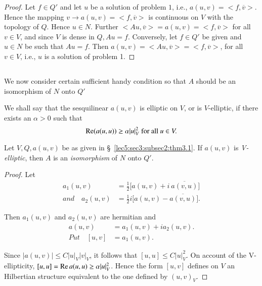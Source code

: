\begin{proof}%
Let $f \in Q'$ and let $u$ be a solution of problem $1$, i.e.,
$a(u, v) = <f, \overline{v}>$. Hence the mapping $v \rightarrow a(u,
v) =   <f, \overline{v}>$ is continuous on $V$ with the topology of
$Q$. Hence $u \in N$. Further $<A u, \overline{v}> = a (u,v) =
<f, \overline{v}>$ for all $v \in V$, and since $V$ is dense
in $Q, Au = f$. Conversely, let $f \in Q'$ be given and $u
\in N$ be such that $Au = f$. Then $a(u, v) = <Au,
\overline{v}> =  <f, \overline{v}>$, for all $v \in V$, i.e.,
$u$ is a solution of problem 1. 
\end{proof}

\subsection{}\label{lec5:sec3:subsec2} 

We now consider certain sufficient handy
condition so that $A$ should be an isomorphism of $N$ onto $Q'$ 
\begin{definition}\label{lec5:sec3:subsec2:def3.2}%
  We shall say that the sesquilinear $a(u, v)$ is elliptic on $V$, or is
  $V$-elliptic, if there exists an $\alpha > 0$ such that 
  $$
  \operatorname{Re}  (a(u, u)) \ge \alpha | u|^2_V \text{ for all } u \in V.
  $$
\end{definition}

\begin{theorem}\label{lec5:sec3:subsec2:thm3.1}%
  Let $V, Q, a(u, v)$ be as given in \S\ \ref{lec5:sec3:subsec2:thm3.1}. If $a(u, v)$ is {\em  
  V-elliptic}, then $A$ is an {\em isomorphism} of $N$ onto $Q'$. 
\end{theorem}

\begin{proof}%
Let\pageoriginale
\begin{align*}a_1(u, v) & = \frac{1}{2}\big[  a(u, v) + i~
  \overline{a(v,u)}  \big ]\\ 
and \quad a_2(u, v) & = \frac{1}{2} i \big[  a(u, v) -
  \overline{a(v,u)}  \big ]. 
\end{align*}

Then $a_1(u, v) $ and $a_2(u, v) $ are hermitian and
\begin{align*}
a(u, v)& = a_1(u, v) + i a_2(u, v).\\
Put \quad [u, v] &= a_1(u, v).
\end{align*}

Since $|a(u, v)| \le C |u|_V |v|_V$, it follows that $[u,u]\le C
|u|^2_V$.  On account of the V-ellipticity, $[u, u]= \operatorname{Re}  a (u, u)\ge
\alpha |u|^2_V$. Hence the form $[u, v]$ defines on $V$ an Hilbertian
structure equivalent to the one defined by $(u, v)_V$. 
\end{proof}

